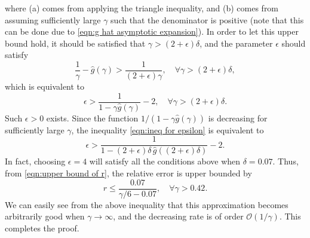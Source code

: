 \documentclass[journal,twocolumn]{IEEEtran}
\theoremstyle{nonumberplain}
\begin{document}
    where (a) comes from applying the triangle inequality, and (b) comes from assuming sufficiently large $\gamma$ such that the denominator is positive (note that this can be done due to \eqref{eqn:g hat asymptotic expansion}).
    In order to let this upper bound hold, it should be satisfied that $\gamma > (2+\epsilon)\delta$, and the parameter $\epsilon$ should satisfy 
    \begin{equation}
        \frac{1}{\gamma} - \hat{g}(\gamma) > \frac{1}{(2+\epsilon)\gamma}, \quad\forall \gamma > (2+\epsilon)\delta,
    \end{equation}
    which is equivalent to 
    \begin{equation}
        \epsilon > \frac{1}{1-\gamma \hat{g}(\gamma)}-2,\quad \forall \gamma > (2+\epsilon)\delta.
        \label{eqn:ineq for epsilon}
    \end{equation}
    Such $\epsilon>0$ exists. Since the function $ 1/(1-\gamma \hat{g}(\gamma))$ is decreasing for sufficiently large $\gamma$, the inequality \eqref{eqn:ineq for epsilon} is equivalent to 
    \begin{equation}
        \epsilon > \frac{1}{1-(2+\epsilon)\delta\, \hat{g}((2+\epsilon)\delta)}-2.
    \end{equation}
    In fact, choosing $\epsilon=4$ will satisfy all the conditions above when $\delta = 0.07$. Thus, from \eqref{eqn:upper bound of r}, the relative error is upper bounded by 
    \begin{equation}
        r \leq \frac{0.07}{\gamma/6 - 0.07},\quad \forall \gamma > 0.42.
    \end{equation}
    We can easily see from the above inequality that this approximation becomes arbitrarily good when $\gamma\to\infty$, and the decreasing rate is of order $\mathcal{O}(1/\gamma)$. This completes the proof. 

\footnotesize
\balance 


\end{document}
